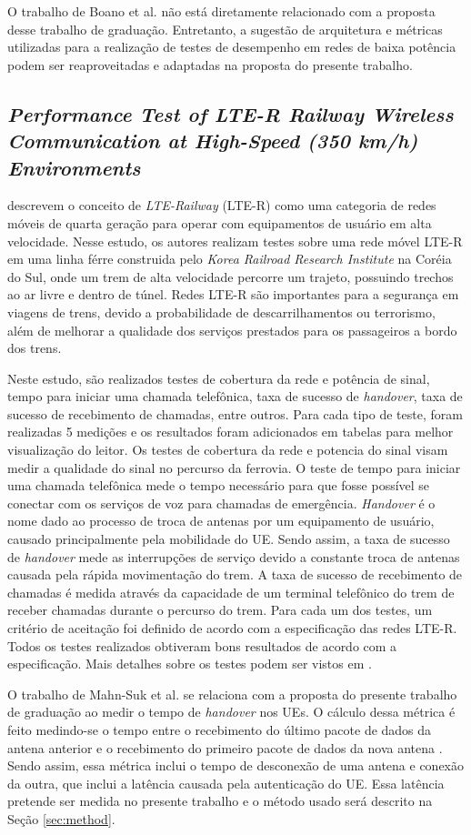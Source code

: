 O trabalho de Boano et al. não está diretamente relacionado com a proposta desse trabalho de graduação.
Entretanto, a sugestão de arquitetura e métricas utilizadas para a realização de testes de desempenho em redes de baixa potência podem ser reaproveitadas e adaptadas na proposta do presente trabalho.

\subsection{\textit{Performance Test of LTE-R Railway Wireless Communication at High-Speed (350 km/h) Environments}}

\cite{MahnSuk2018} descrevem o conceito de \textit{LTE-Railway} (LTE-R) como uma categoria de redes móveis de quarta geração para operar com equipamentos de usuário em alta velocidade.
Nesse estudo, os autores realizam testes sobre uma rede móvel LTE-R em uma linha férre construida pelo \textit{Korea Railroad Research Institute} na Coréia do Sul, onde um trem de alta velocidade percorre um trajeto, possuindo trechos ao ar livre e dentro de túnel.
Redes LTE-R são importantes para a segurança em viagens de trens, devido a probabilidade de descarrilhamentos ou terrorismo, além de melhorar a qualidade dos serviços prestados para os passageiros a bordo dos trens.

Neste estudo, são realizados testes de cobertura da rede e potência de sinal, tempo para iniciar uma chamada telefônica, taxa de sucesso de \textit{handover}, taxa de sucesso de recebimento de chamadas, entre outros.
Para cada tipo de teste, foram realizadas 5 medições e os resultados foram adicionados em tabelas para melhor visualização do leitor.
Os testes de cobertura da rede e potencia do sinal visam medir a qualidade do sinal no percurso da ferrovia.
O teste de tempo para iniciar uma chamada telefônica mede o tempo necessário para que fosse possível se conectar com os serviços de voz para chamadas de emergência.
\textit{Handover} é o nome dado ao processo de troca de antenas por um equipamento de usuário, causado principalmente pela mobilidade do UE. Sendo assim, a taxa de sucesso de \textit{handover} mede as interrupções de serviço devido a constante troca de antenas causada pela rápida movimentação do trem.
A taxa de sucesso de recebimento de chamadas é medida através da capacidade de um terminal telefônico do trem de receber chamadas durante o percurso do trem.
Para cada um dos testes, um critério de aceitação foi definido de acordo com a especificação das redes LTE-R. Todos os testes realizados obtiveram bons resultados de acordo com a especificação. Mais detalhes sobre os testes podem ser vistos em \cite{MahnSuk2018}.

O trabalho de Mahn-Suk et al. se relaciona com a proposta do presente trabalho de graduação ao medir o tempo de \textit{handover} nos UEs.
O cálculo dessa métrica é feito medindo-se o tempo entre o recebimento do último pacote de dados da antena anterior e o recebimento do primeiro pacote de dados da nova antena \cite{Tayyab2019}.
Sendo assim, essa métrica inclui o tempo de desconexão de uma antena e conexão da outra, que inclui a latência causada pela autenticação do UE.
Essa latência pretende ser medida no presente trabalho e o método usado será descrito na Seção \ref{sec:method}.
